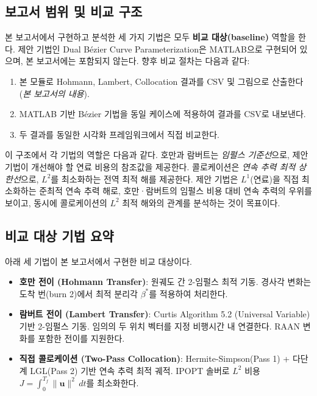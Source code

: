 \documentclass[11pt]{article}
\begin{document}
\subsection{보고서 범위 및 비교 구조}

본 보고서에서 구현하고 분석한 세 가지 기법은 모두 \textbf{비교 대상(baseline)} 역할을 한다.
제안 기법인 Dual B\'{e}zier Curve Parameterization은 MATLAB으로 구현되어 있으며, 본 보고서에는 포함되지 않는다.
향후 비교 절차는 다음과 같다:

\begin{enumerate}
  \item 본 모듈로 Hohmann, Lambert, Collocation 결과를 CSV 및 그림으로 산출한다 (\textit{본 보고서의 내용}).
  \item MATLAB 기반 B\'{e}zier 기법을 동일 케이스에 적용하여 결과를 CSV로 내보낸다.
  \item 두 결과를 동일한 시각화 프레임워크에서 직접 비교한다.
\end{enumerate}

\noindent 이 구조에서 각 기법의 역할은 다음과 같다.
호만과 람버트는 \textit{임펄스 기준선}으로, 제안 기법이 개선해야 할 연료 비용의 참조값을 제공한다.
콜로케이션은 \textit{연속 추력 최적 상한선}으로, $L^2$를 최소화하는 전역 최적 해를 제공한다.
제안 기법은 $L^1$(연료)을 직접 최소화하는 준최적 연속 추력 해로, 호만·람버트의 임펄스 비용 대비 연속 추력의 우위를 보이고, 동시에 콜로케이션의 $L^2$ 최적 해와의 관계를 분석하는 것이 목표이다.

\subsection{비교 대상 기법 요약}

아래 세 기법이 본 보고서에서 구현한 비교 대상이다.

\begin{itemize}
  \item \textbf{호만 전이 (Hohmann Transfer)}: 원궤도 간 2-임펄스 최적 기동. 경사각 변화는 도착 번(burn 2)에서 최적 분리각 $\beta^*$를 적용하여 처리한다.
  \item \textbf{람버트 전이 (Lambert Transfer)}: Curtis Algorithm 5.2 (Universal Variable) 기반 2-임펄스 기동. 임의의 두 위치 벡터를 지정 비행시간 내 연결한다. RAAN 변화를 포함한 전이를 지원한다.
  \item \textbf{직접 콜로케이션 (Two-Pass Collocation)}: Hermite-Simpson(Pass 1) + 다단계 LGL(Pass 2) 기반 연속 추력 최적 궤적. IPOPT 솔버로 $L^2$ 비용 $J = \int_0^{T_f} \|\mathbf{u}\|^2 \, dt$를 최소화한다.
\end{itemize}
\end{document}
